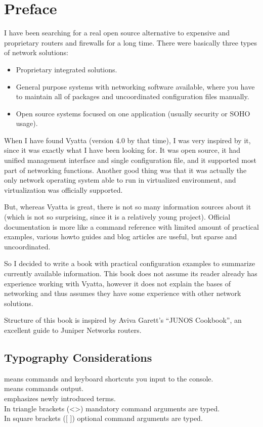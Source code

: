 \chapter*{Preface}
I have been searching for a real open source alternative to expensive and proprietary routers and firewalls for a long time. There were basically three types of network solutions:
\begin{itemize}
 \item Proprietary integrated solutions.
 \item General purpose systems with networking software available, where you have to maintain all of packages and
 uncoordinated configuration files manually.
 \item Open source systems focused on one application (usually security or SOHO usage).
\end{itemize}
When I have found Vyatta (version 4.0 by that time), I was very inspired by it, since it was exactly what I have been
looking for. It was open source, it had unified management interface and single configuration file, and it supported 
most part of networking functions. Another good thing was that it was actually the only network operating system able to run in virtualized environment, and virtualization was officially supported.

But, whereas Vyatta is great, there is not so many information sources about it (which is not so surprising, since it is a relatively young project). Official documentation is more like a command reference with limited amount of practical examples, various howto guides and blog articles are useful, but sparse and uncoordinated.

So I decided to write a book with practical configuration examples to summarize currently available information. This book does not assume its reader already has experience working with Vyatta, however it does not explain the bases of networking and thus assumes they have some experience with other network solutions.

Structure of this book is inspired by Aviva Garett's ``JUNOS Cookbook'', an excellent guide to Juniper Networks routers.

\section*{Typography Considerations}
 means commands and keyboard shortcuts you input to the console. \\
 means commands output. \\
 emphasizes newly introduced terms. \\
In triangle brackets (\textless \textgreater) mandatory command arguments are typed. \\
In square brackets ([ ]) optional command arguments are typed. 

